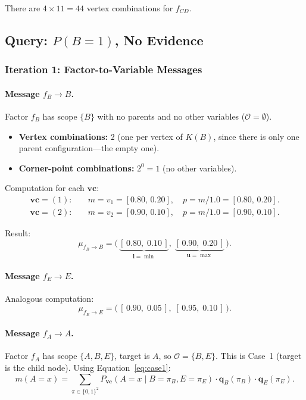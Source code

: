 \documentclass{article}
\begin{document}
There are $4 \times 11 = 44$ vertex combinations for $f_{CD}$.

\subsection{Query: $P(B{=}1)$, No Evidence}

\subsubsection{Iteration 1: Factor-to-Variable Messages}

\paragraph{Message $f_B \to B$.}
Factor $f_B$ has scope $\{B\}$ with no parents and no other variables ($\mathcal{O} = \emptyset$).

\begin{itemize}
\item \textbf{Vertex combinations:} 2 (one per vertex of $K(B)$, since there is only one parent configuration---the empty one).
\item \textbf{Corner-point combinations:} $2^0 = 1$ (no other variables).
\end{itemize}

Computation for each $\mathbf{vc}$:
\begin{align*}
  \mathbf{vc} = (1): \quad & m = v_1 = [0.80,\, 0.20], \quad
  p = m / 1.0 = [0.80,\, 0.20]. \\
  \mathbf{vc} = (2): \quad & m = v_2 = [0.90,\, 0.10], \quad
  p = m / 1.0 = [0.90,\, 0.10].
\end{align*}

Result:
\[
  \mu_{f_B \to B} = \bigl(\,\underbrace{[\,0.80,\; 0.10\,]}_{\mathbf{l} = \min},\;
  \underbrace{[\,0.90,\; 0.20\,]}_{\mathbf{u} = \max}\,\bigr).
\]

\paragraph{Message $f_E \to E$.} Analogous computation:
\[
  \mu_{f_E \to E} = \bigl(\,[\,0.90,\; 0.05\,],\; [\,0.95,\; 0.10\,]\,\bigr).
\]

\paragraph{Message $f_A \to A$.}
Factor $f_A$ has scope $\{A, B, E\}$, target is $A$, so $\mathcal{O} = \{B, E\}$.
This is Case~1 (target is the child node). Using Equation~\ref{eq:case1}:
\[
  m(A{=}x) = \sum_{\pi \in \{0,1\}^2} P_{\mathbf{vc}}(A{=}x \mid B{=}\pi_B, E{=}\pi_E)
  \cdot \mathbf{q}_B(\pi_B) \cdot \mathbf{q}_E(\pi_E).
\]
\end{document}
